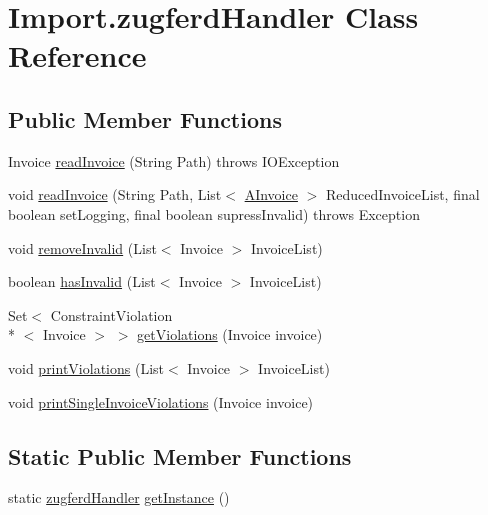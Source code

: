 \hypertarget{class_import_1_1zugferd_handler}{\section{Import.\-zugferd\-Handler Class Reference}
\label{class_import_1_1zugferd_handler}
}
\subsection*{Public Member Functions}
\begin{DoxyCompactItemize}
\item 
Invoice \hyperlink{class_import_1_1zugferd_handler_aea79c23595f003c943e908c95276ecf9}{read\-Invoice} (String Path)  throws I\-O\-Exception
\item 
void \hyperlink{class_import_1_1zugferd_handler_a693fba6ff3bd23bb4783578b385e38a4}{read\-Invoice} (String Path, List$<$ \hyperlink{class_reduced_invoice_1_1_a_invoice}{A\-Invoice} $>$ Reduced\-Invoice\-List, final boolean set\-Logging, final boolean supress\-Invalid)  throws Exception 	
\item 
void \hyperlink{class_import_1_1zugferd_handler_aa5fbab8b4a7835f2b13167452f9d17db}{remove\-Invalid} (List$<$ Invoice $>$ Invoice\-List)
\item 
boolean \hyperlink{class_import_1_1zugferd_handler_a6999d186193b120650a5d24a49d10c6c}{has\-Invalid} (List$<$ Invoice $>$ Invoice\-List)
\item 
Set$<$ Constraint\-Violation\\*
$<$ Invoice $>$ $>$ \hyperlink{class_import_1_1zugferd_handler_acf26740b73f820812fadb01ccf712dd2}{get\-Violations} (Invoice invoice)
\item 
void \hyperlink{class_import_1_1zugferd_handler_ae8ae1fcc05ebddf4d2b53c8daeda7b00}{print\-Violations} (List$<$ Invoice $>$ Invoice\-List)
\item 
void \hyperlink{class_import_1_1zugferd_handler_aadb33b773805373add19d92eb713831b}{print\-Single\-Invoice\-Violations} (Invoice invoice)
\end{DoxyCompactItemize}
\subsection*{Static Public Member Functions}
\begin{DoxyCompactItemize}
\item 
static \hyperlink{class_import_1_1zugferd_handler}{zugferd\-Handler} \hyperlink{class_import_1_1zugferd_handler_ad3acd84340c8a5fcb2c01a2636979786}{get\-Instance} ()
\end{DoxyCompactItemize}


